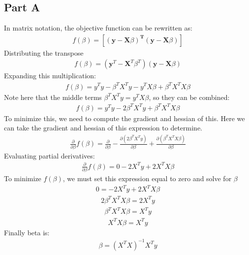 \documentclass{article}
\begin{document}
\subsection*{Part A}
In matrix notation, the objective function can be rewritten as:
\begin{align*}
f(\beta)=[(\textbf{y}-\textbf{X}\beta)^\textbf{T} (\textbf{y}-\textbf{X}\beta)]
\end{align*}
Distributing the transpose
\begin{align*}
f(\beta)=(\textbf{y}^T-\textbf{X}^T\beta^T) (\textbf{y}-\textbf{X}\beta)
\end{align*}
Expanding this multiplication:
\begin{align*}
f(\beta)= y^Ty - \beta^T X^T y - y^T X \beta + \beta^T X^T X \beta
\end{align*}
Note here that the middle terms $\beta^T X^T y=y^T X \beta$, so they can be combined:
\begin{align*}
f(\beta)= y^Ty - 2\beta^T X^T y + \beta^T X^T X \beta
\end{align*}
To minimize this, we need to compute the gradient and hessian of this. Here we can take the gradient and hessian of this expression to determine.
\begin{align*}
\frac{\partial}{\partial \beta} f(\beta) = \frac{\partial}{\partial\beta} - \frac{\partial (2\beta^T X^T y)}{\partial \beta} + \frac{\partial (\beta^T X^T X \beta)}{\partial \beta} 
\end{align*}
Evaluating partial derivatives:
\begin{align*}
\frac{\partial}{\partial \beta} f(\beta) = 0 - 2X^Ty + 2 X^T X \beta
\end{align*}
To minimize $f(\beta)$, we must set this expression equal to zero and solve for $\beta$
\begin{align*}
0 = -2X^Ty + 2X^T X \beta
\end{align*}
\begin{align*}
2\beta^T X^T X \beta = 2X^Ty
\end{align*}
\begin{align*}
\beta^T X^T X \beta = X^Ty
\end{align*}
\begin{align*}
X^T X \beta = X^Ty
\end{align*}
Finally beta is:
\begin{align*}
\boxed{\beta = (X^T X)^{-1} X^Ty}
\end{align*}
\clearpage
\end{document}
